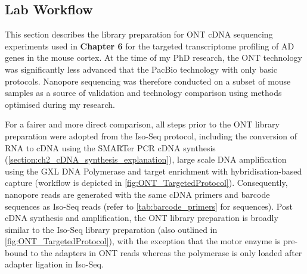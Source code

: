 \clearpage
\subsection{Lab Workflow}
\label{chap:ont_labpipeline}
This section describes the library preparation for ONT cDNA sequencing experiments used in \textbf{Chapter 6} for the targeted transcriptome profiling of AD genes in the mouse cortex. At the time of my PhD research, the ONT technology was significantly less advanced that the PacBio technology with only basic protocols. Nanopore sequencing was therefore conducted on a subset of mouse samples as a source of validation and technology comparison using methods optimised during my research. 

For a fairer and more direct comparison, all steps prior to the ONT library preparation were adopted from the Iso-Seq protocol, including the conversion of RNA to cDNA using the SMARTer PCR cDNA synthesis (\cref{section:ch2_cDNA_synthesis_explanation}), large scale DNA amplification using the GXL DNA Polymerase and target enrichment with hybridisation-based capture (workflow is depicted in \cref{fig:ONT_TargetedProtocol}). Consequently, nanopore reads are generated with the same cDNA primers and barcode sequences as Iso-Seq reads (refer to \cref{tab:barcode_primers} for sequences). Post cDNA synthesis and amplification, the ONT library preparation is broadly similar to the Iso-Seq library preparation (also outlined in \cref{fig:ONT_TargetedProtocol}), with the exception that the motor enzyme is pre-bound to the adapters in ONT reads whereas the polymerase is only loaded after adapter ligation in Iso-Seq.  

